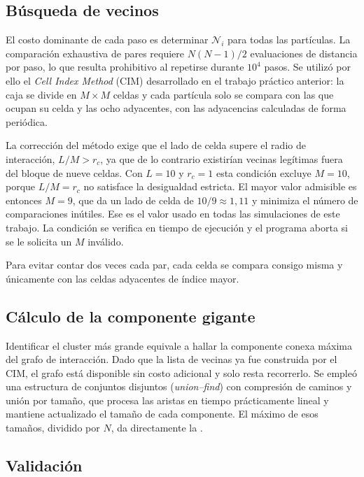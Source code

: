 \documentclass[11pt,a4paper]{article}
\begin{document}
\subsection{Búsqueda de vecinos}

El costo dominante de cada paso es determinar $\mathcal{N}_i$ para todas las
partículas. La comparación exhaustiva de pares requiere $N(N-1)/2$ evaluaciones
de distancia por paso, lo que resulta prohibitivo al repetirse durante
$10^4$ pasos. Se utilizó por ello el \emph{Cell Index Method} (CIM) desarrollado
en el trabajo práctico anterior: la caja se divide en $M \times M$ celdas y cada
partícula solo se compara con las que ocupan su celda y las ocho adyacentes, con
las adyacencias calculadas de forma periódica.

La corrección del método exige que el lado de celda supere el radio de
interacción, $L/M > r_c$, ya que de lo contrario existirían vecinas legítimas
fuera del bloque de nueve celdas. Con $L = 10$ y $r_c = 1$ esta condición excluye
$M = 10$, porque $L/M = r_c$ no satisface la desigualdad estricta. El mayor valor
admisible es entonces $M = 9$, que da un lado de celda de $10/9 \approx 1{,}11$ y
minimiza el número de comparaciones inútiles. Ese es el valor usado en todas las
simulaciones de este trabajo. La condición se verifica en tiempo de ejecución y
el programa aborta si se le solicita un $M$ inválido.

Para evitar contar dos veces cada par, cada celda se compara consigo misma y
únicamente con las celdas adyacentes de índice mayor.

\subsection{Cálculo de la componente gigante}

Identificar el cluster más grande equivale a hallar la componente conexa máxima
del grafo de interacción. Dado que la lista de vecinas ya fue construida por el
CIM, el grafo está disponible sin costo adicional y solo resta recorrerlo. Se
empleó una estructura de conjuntos disjuntos (\emph{union--find}) con compresión
de caminos y unión por tamaño, que procesa las aristas en tiempo prácticamente
lineal y mantiene actualizado el tamaño de cada componente. El máximo de esos
tamaños, dividido por $N$, da directamente la .

\subsection{Validación}
\end{document}
